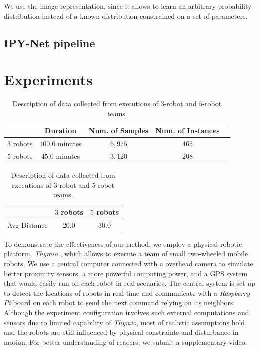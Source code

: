 \documentclass[letterpaper, 10 pt, conference]{ieeeconf}  %
\begin{document}
	We use the image representation, since it allows to learn an arbitrary probability distribution 
	instead of a known distribution constrained on a set of parameters.
	
	
	\subsection{IPY-Net pipeline}
	\label{sec:ipy-net_pipeline}
	 
	
	
	\section{Experiments} 
	\label{sec:experiments} 
	
	
	\begin{table}[t]
		\label{table:data_description}
		\centering
		\begin{tabular}{|c|c|c|c|c|}
			\hline
						&  Duration & Num. of Samples & Num. of Instances  \\ \hline
			$3$ robots & $100.6$ minutes & $6,975$ & $465$  \\ \hline
			$5$ robots & $45.0$ minutes  & $3,120$ & $208$  \\ \hline
		\end{tabular}
		\caption{Description of data collected from executions of $3$-robot and $5$-robot teams.}
	\end{table}

	\begin{table}[]
		\label{table:overall_performance}
		\centering
		\begin{tabular}{|c|c|c|}
			\hline
			&  $3$ robots & $5$ robots  \\ \hline
			Avg Distance & $20.0$ & $30.0$  \\ \hline
		\end{tabular}	
		\caption{Description of data collected from executions of $3$-robot and $5$-robot teams.}
	\end{table}
	
	
	To demonstrate the effectiveness of our method, we employ a physical robotic platform, 
	\emph{Thymio} \cite{Shin14}, which allows to execute a team of small two-wheeled mobile robots.   
	We use a central computer connected with a overhead camera to simulate better proximity 
	sensors, a more powerful computing power, and a GPS system that would easily run on each robot in 
	real scenarios. The central system is set up to detect the locations of robots in real time 
	and communicate with a \emph{Raspberry Pi} board \cite{Upton14} on each robot to send
	the next command relying on its neighbors. Although the experiment configuration involves 
	such external computations and sensors due to limited capability of \emph{Thymio}, 
	most of realistic assumptions hold, and the robots are still influenced by 
	physical constraints and disturbance in motion. For better understanding of readers, 
	we submit a supplementary video. 
	
\end{document}
